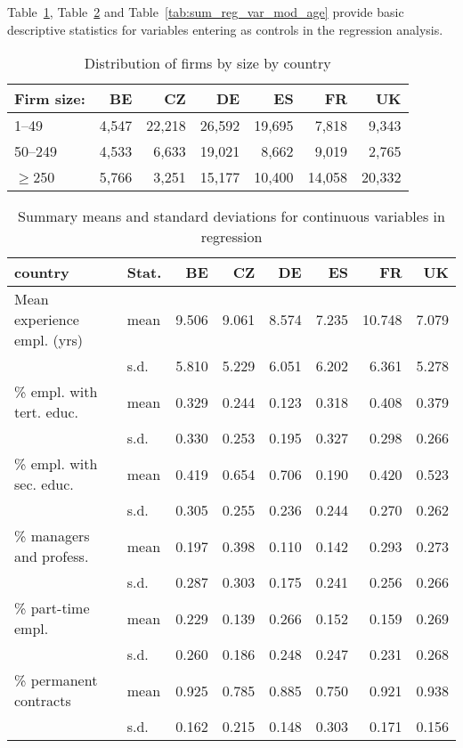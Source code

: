 \documentclass[Review,times,sageh,11pt]{sagej}
\begin{document}
\bigskip

\noindent Table~\ref{tab:firm_size}, Table~\ref{tab:sum_reg_var_cont} and Table~\ref{tab:sum_reg_var_mod_age} provide basic descriptive statistics for variables entering as controls in the regression analysis.

\begin{table}[ht]
\centering
\small
\caption{Distribution of firms by size by country}
\label{tab:firm_size}
\begin{tabular}{lrrrrrr}
\toprule
Firm size: & BE    & CZ     & DE     & ES     & FR     & UK     \\
\midrule
1--49      & 4,547 & 22,218 & 26,592 & 19,695 & 7,818  & 9,343  \\
50--249    & 4,533 & 6,633  & 19,021 & 8,662  & 9,019  & 2,765  \\
$\geq$250  & 5,766 & 3,251  & 15,177 & 10,400 & 14,058 & 20,332 \\
\bottomrule
\end{tabular}

 \end{table}

\begin{table}[htp]
\caption{Summary means and standard deviations for continuous variables in regression}
\label{tab:sum_reg_var_cont}
\centering
\small
\begin{tabular}{llrrrrrr}
\toprule
country                     & Stat. & BE    & CZ    & DE    & ES    & FR     & UK    \\
\midrule
Mean experience empl. (yrs) & mean & 9.506 & 9.061 & 8.574 & 7.235 & 10.748 & 7.079 \\
                            & s.d. & 5.810 & 5.229 & 6.051 & 6.202 & 6.361  & 5.278 \\[1ex]
\% empl. with tert. educ.   & mean & 0.329 & 0.244 & 0.123 & 0.318 & 0.408  & 0.379 \\
                            & s.d. & 0.330 & 0.253 & 0.195 & 0.327 & 0.298  & 0.266 \\[1ex]
\% empl. with sec. educ.    & mean & 0.419 & 0.654 & 0.706 & 0.190 & 0.420  & 0.523 \\
                            & s.d. & 0.305 & 0.255 & 0.236 & 0.244 & 0.270  & 0.262 \\[1ex]
\% managers and profess.    & mean & 0.197 & 0.398 & 0.110 & 0.142 & 0.293  & 0.273 \\
                            & s.d. & 0.287 & 0.303 & 0.175 & 0.241 & 0.256  & 0.266 \\[1ex]
\% part-time empl.          & mean & 0.229 & 0.139 & 0.266 & 0.152 & 0.159  & 0.269 \\
                            & s.d. & 0.260 & 0.186 & 0.248 & 0.247 & 0.231  & 0.268 \\[1ex]
\% permanent contracts      & mean & 0.925 & 0.785 & 0.885 & 0.750 & 0.921  & 0.938 \\
                            & s.d. & 0.162 & 0.215 & 0.148 & 0.303 & 0.171  & 0.156 \\
\bottomrule                            
\end{tabular}

 \end{table}
\end{document}
